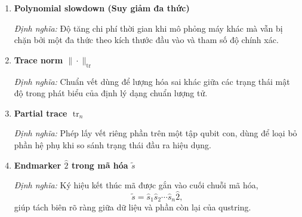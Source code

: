 \documentclass[12pt,a4paper]{article}
\begin{document}
\begin{enumerate}[leftmargin=*,itemsep=0.8em]
\textit{Định nghĩa:} Mã hóa đầu vào cho máy phổ quát, gồm mô tả máy $M$, dữ liệu $x$, số bước $t$ và ngưỡng sai số $\varepsilon$.

\item \textbf{Polynomial slowdown (Suy giảm đa thức)}

\textit{Định nghĩa:} Độ tăng chi phí thời gian khi mô phỏng máy khác mà vẫn bị chặn bởi một đa thức theo kích thước đầu vào và tham số độ chính xác.

\item \textbf{Trace norm $\|\cdot\|_{\mathrm{tr}}$}

\textit{Định nghĩa:} Chuẩn vết dùng để lượng hóa sai khác giữa các trạng thái mật độ trong phát biểu của định lý dạng chuẩn lượng tử.

\item \textbf{Partial trace $\operatorname{tr}_n$}

\textit{Định nghĩa:} Phép lấy vết riêng phần trên một tập qubit con, dùng để loại bỏ phần hệ phụ khi so sánh trạng thái đầu ra hiệu dụng.

\item \textbf{Endmarker $\hat{2}$ trong mã hóa $\widetilde{s}$}

\textit{Định nghĩa:} Ký hiệu kết thúc mã được gắn vào cuối chuỗi mã hóa,
\[
\widetilde{s}=\hat{s}_1\hat{s}_2\cdots\hat{s}_n\hat{2},
\]
giúp tách biên rõ ràng giữa dữ liệu và phần còn lại của qustring.

\end{enumerate}
\end{document}
